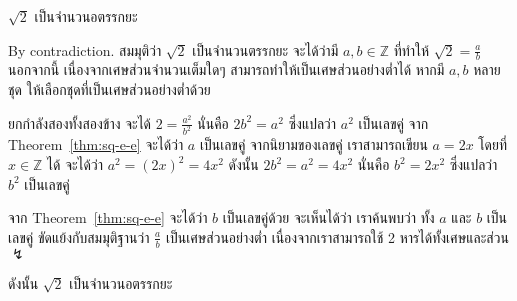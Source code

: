 \begin{theorem}
$\sqrt{2}$ เป็นจำนวนอตรรกยะ
\begin{pf}
By contradiction. สมมุติว่า $\sqrt{2}$ เป็นจำนวนตรรกยะ จะได้ว่ามี $a,b\in\mathbb{Z}$ ที่ทำให้ $\sqrt{2}=\frac{a}{b}$ นอกจากนี้ เนื่องจากเศษส่วนจำนวนเต็มใดๆ สามารถทำให้เป็นเศษส่วนอย่างต่ำได้ หากมี $a,b$ หลายชุด ให้เลือกชุดที่เป็นเศษส่วนอย่างต่ำด้วย

ยกกำลังสองทั้งสองข้าง จะได้ $2=\frac{a^2}{b^2}$ นั่นคือ $2b^2=a^2$ ซึ่งแปลว่า $a^2$ เป็นเลขคู่ จาก Theorem~\ref{thm:sq-e-e} จะได้ว่า $a$ เป็นเลขคู่ จากนิยามของเลขคู่ เราสามารถเขียน $a=2x$ โดยที่ $x\in\mathbb{Z}$ ได้ จะได้ว่า $a^2=(2x)^2=4x^2$ ดังนั้น $2b^2=a^2=4x^2$ นั่นคือ $b^2=2x^2$ ซึ่งแปลว่า $b^2$ เป็นเลขคู่

จาก Theorem~\ref{thm:sq-e-e} จะได้ว่า $b$ เป็นเลขคู่ด้วย จะเห็นได้ว่า เราค้นพบว่า ทั้ง $a$ และ $b$ เป็นเลขคู่ ขัดแย้งกับสมมุติฐานว่า $\frac{a}{b}$ เป็นเศษส่วนอย่างต่ำ เนื่องจากเราสามารถใช้ 2 หารได้ทั้งเศษและส่วน $\lightning$

ดังนั้น $\sqrt{2}$ เป็นจำนวนอตรรกยะ
\end{pf}

\end{theorem}
%
